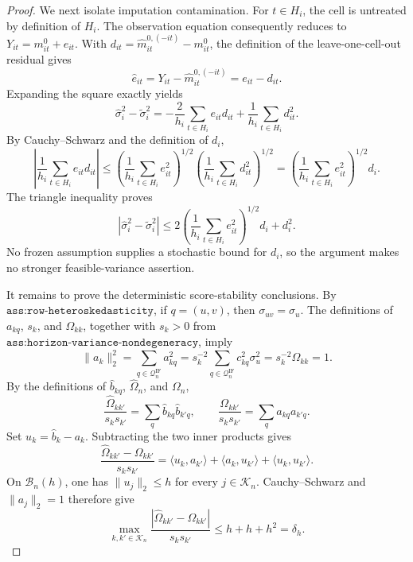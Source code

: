 \documentclass{article}
\begin{document}
\begin{proof}
We next isolate imputation contamination.  For \(t\in H_i\), the cell is
untreated by definition of \(H_i\).  The observation equation consequently
reduces to \(Y_{it}=m^0_{it}+e_{it}\).  With
\(d_{it}=\widehat m_{it}^{0,(-it)}-m^0_{it}\), the definition of the
leave-one-cell-out residual gives
\[
 \widehat e_{it}=Y_{it}-\widehat m_{it}^{0,(-it)}=e_{it}-d_{it}.
\]
Expanding the square exactly yields
\[
 \widehat\sigma_i^2-\widetilde\sigma_i^2
 =-\frac2{h_i}\sum_{t\in H_i}e_{it}d_{it}
 +\frac1{h_i}\sum_{t\in H_i}d_{it}^2.
\]
By Cauchy--Schwarz and the definition of \(d_i\),
\[
 \left|\frac1{h_i}\sum_{t\in H_i}e_{it}d_{it}\right|
 \le
 \left(\frac1{h_i}\sum_{t\in H_i}e_{it}^2\right)^{1/2}
 \left(\frac1{h_i}\sum_{t\in H_i}d_{it}^2\right)^{1/2}
 =\left(\frac1{h_i}\sum_{t\in H_i}e_{it}^2\right)^{1/2}d_i.
\]
The triangle inequality proves
\[
 |\widehat\sigma_i^2-\widetilde\sigma_i^2|
 \le2\left(\frac1{h_i}\sum_{t\in H_i}e_{it}^2\right)^{1/2}d_i+d_i^2.
\]
No frozen assumption supplies a stochastic bound for \(d_i\), so the
argument makes no stronger feasible-variance assertion.

It remains to prove the deterministic score-stability conclusions.  By
\(\texttt{ass:row-heteroskedasticity}\), if \(q=(u,v)\), then
\(\sigma_{uv}=\sigma_u\).  The definitions of \(a_{kq}\), \(s_k\), and
\(\Omega_{kk}\), together with \(s_k>0\) from
\(\texttt{ass:horizon-variance-nondegeneracy}\), imply
\[
 \|a_k\|_2^2
 =\sum_{q\in\mathcal Q_n^{\mathrm{IF}}}a_{kq}^2
 =s_k^{-2}\sum_{q\in\mathcal Q_n^{\mathrm{IF}}}c_{kq}^2\sigma_u^2
 =s_k^{-2}\Omega_{kk}=1.
\]
By the definitions of \(\widehat b_{kq}\), \(\widehat\Omega_n\), and
\(\Omega_n\),
\[
 \frac{\widehat\Omega_{kk'}}{s_ks_{k'}}
 =\sum_q\widehat b_{kq}\widehat b_{k'q},
 \qquad
 \frac{\Omega_{kk'}}{s_ks_{k'}}
 =\sum_qa_{kq}a_{k'q}.
\]
Set \(u_k=\widehat b_k-a_k\).  Subtracting the two inner products gives
\[
 \frac{\widehat\Omega_{kk'}-\Omega_{kk'}}{s_ks_{k'}}
 =\langle u_k,a_{k'}\rangle
 +\langle a_k,u_{k'}\rangle
 +\langle u_k,u_{k'}\rangle.
\]
On \(\mathcal B_n(h)\), one has \(\|u_j\|_2\le h\) for every
\(j\in\mathcal K_n\).  Cauchy--Schwarz and \(\|a_j\|_2=1\) therefore
give
\[
 \max_{k,k'\in\mathcal K_n}
 \frac{|\widehat\Omega_{kk'}-\Omega_{kk'}|}{s_ks_{k'}}
 \le h+h+h^2=\delta_h.
\]


\end{proof}
\end{document}
